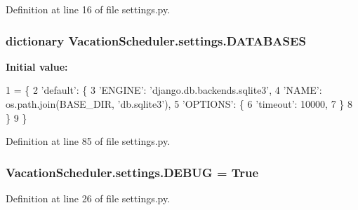 Definition at line 16 of file settings.\-py.

\hypertarget{namespaceVacationScheduler_1_1settings_a2b465f83c1bf6c2459017cd34b78b07f}{
\subsubsection[{D\-A\-T\-A\-B\-A\-S\-E\-S}]{\setlength{\rightskip}{0pt plus 5cm}dictionary Vacation\-Scheduler.\-settings.\-D\-A\-T\-A\-B\-A\-S\-E\-S}}\label{namespaceVacationScheduler_1_1settings_a2b465f83c1bf6c2459017cd34b78b07f}
{\bfseries Initial value\-:}
\begin{DoxyCode}
1 = \{
2     \textcolor{stringliteral}{'default'}: \{
3         \textcolor{stringliteral}{'ENGINE'}: \textcolor{stringliteral}{'django.db.backends.sqlite3'},
4         \textcolor{stringliteral}{'NAME'}: os.path.join(BASE\_DIR, \textcolor{stringliteral}{'db.sqlite3'}),
5         \textcolor{stringliteral}{'OPTIONS'}: \{
6             \textcolor{stringliteral}{'timeout'}: 10000,
7         \}
8     \}
9 \}
\end{DoxyCode}


Definition at line 85 of file settings.\-py.

\hypertarget{namespaceVacationScheduler_1_1settings_aac5b371fe5ecede3f3f68e05a2aabc18}{
\subsubsection[{D\-E\-B\-U\-G}]{\setlength{\rightskip}{0pt plus 5cm}Vacation\-Scheduler.\-settings.\-D\-E\-B\-U\-G = True}}\label{namespaceVacationScheduler_1_1settings_aac5b371fe5ecede3f3f68e05a2aabc18}


Definition at line 26 of file settings.\-py.

